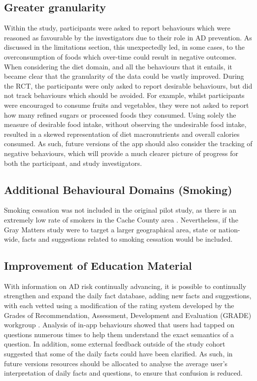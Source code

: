 \subsection{Greater granularity}
Within the study, participants were asked to report behaviours which were reasoned as favourable by the investigators due to their role in AD prevention. As discussed in the limitations section, this unexpectedly led, in some cases, to the overconsumption of foods which over-time could result in negative outcomes. When considering the diet domain, and all the behaviours that it entails, it became clear that the granularity of the data could be vastly improved. During the RCT, the participants were only asked to report desirable behaviours, but did not track behaviours which should be avoided. For example, whilst participants were encouraged to consume fruits and vegetables, they were not asked to report how many refined sugars or processed foods they consumed. Using solely the measure of desirable food intake, without observing the undesirable food intake, resulted in a skewed representation of diet macronutrients and overall calories consumed.
As such, future versions of the app should also consider the tracking of negative behaviours, which will provide a much clearer picture of progress for both the participant, and study investigators.

\subsection{Additional Behavioural Domains (Smoking)}
Smoking cessation was not included in the original pilot study, as there is an extremely low rate of smokers in the Cache County area \cite{UtahDepartmentofHealth2014}. Nevertheless, if the Gray Matters study were to target a larger geographical area, state or nation-wide, facts and suggestions related to smoking cessation would be included.

\subsection{Improvement of Education Material}
With information on AD risk continually advancing, it is possible to continually strengthen and expand the daily fact database, adding new facts and suggestions, with each vetted using a modification of the rating system developed by the Grades of Recommendation, Assessment, Development and Evaluation (GRADE) workgroup \cite{Dijkers2013}. Analysis of in-app behaviours showed that users had tapped on questions numerous times to help them understand the exact semantics of a question. In addition, some external feedback outside of the study cohort suggested that some of the daily facts could have been clarified. As such, in future versions resources should be allocated to analyse the average user’s interpretation of daily facts and questions, to ensure that confusion is reduced.


